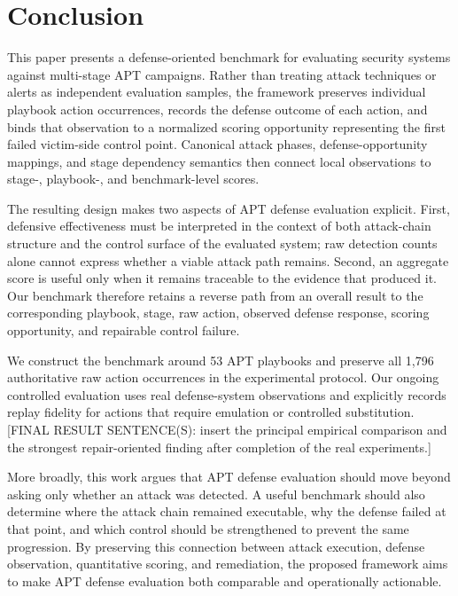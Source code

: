 \section{Conclusion}
\label{sec:conclusion}

This paper presents a defense-oriented benchmark for evaluating security systems against multi-stage APT campaigns. Rather than treating attack techniques or alerts as independent evaluation samples, the framework preserves individual playbook action occurrences, records the defense outcome of each action, and binds that observation to a normalized scoring opportunity representing the first failed victim-side control point. Canonical attack phases, defense-opportunity mappings, and stage dependency semantics then connect local observations to stage-, playbook-, and benchmark-level scores.

The resulting design makes two aspects of APT defense evaluation explicit. First, defensive effectiveness must be interpreted in the context of both attack-chain structure and the control surface of the evaluated system; raw detection counts alone cannot express whether a viable attack path remains. Second, an aggregate score is useful only when it remains traceable to the evidence that produced it. Our benchmark therefore retains a reverse path from an overall result to the corresponding playbook, stage, raw action, observed defense response, scoring opportunity, and repairable control failure.

We construct the benchmark around 53 APT playbooks and preserve all 1,796 authoritative raw action occurrences in the experimental protocol. Our ongoing controlled evaluation uses real defense-system observations and explicitly records replay fidelity for actions that require emulation or controlled substitution. [FINAL RESULT SENTENCE(S): insert the principal empirical comparison and the strongest repair-oriented finding after completion of the real experiments.]

More broadly, this work argues that APT defense evaluation should move beyond asking only whether an attack was detected. A useful benchmark should also determine where the attack chain remained executable, why the defense failed at that point, and which control should be strengthened to prevent the same progression. By preserving this connection between attack execution, defense observation, quantitative scoring, and remediation, the proposed framework aims to make APT defense evaluation both comparable and operationally actionable.